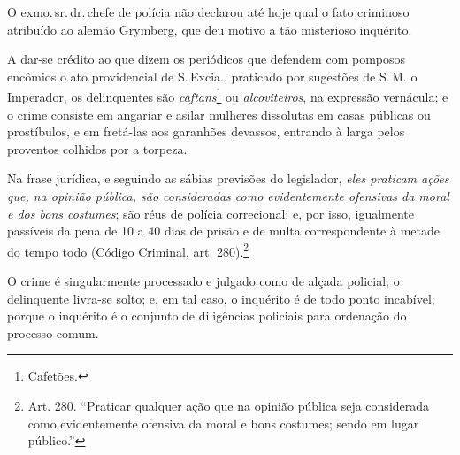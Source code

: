O exmo.\,sr.\,dr.\,chefe de polícia não declarou até hoje qual o fato
criminoso atribuído ao alemão Grymberg, que deu motivo a tão misterioso
inquérito.

A dar-se crédito ao que dizem os periódicos que defendem com pomposos
encômios o ato providencial de S.\,Excia., praticado por sugestões de S.\,M. o Imperador, os delinquentes são \emph{caftans}\footnote{Cafetões.} ou
\emph{alcoviteiros}, na expressão vernácula; e o crime consiste em
angariar e asilar mulheres dissolutas em casas públicas ou prostíbulos,
e em fretá-las aos garanhões devassos, entrando à larga pelos proventos
colhidos por a torpeza.

Na frase jurídica, e seguindo as sábias previsões do legislador,
\emph{eles praticam ações que, na opinião pública, são consideradas como
evidentemente ofensivas da moral e dos bons costumes}; são réus de
polícia correcional; e, por isso, igualmente passíveis da pena de 10 a
40 dias de prisão e de multa correspondente à metade do tempo todo
(Código Criminal, art. 280).\footnote{Art. 280. ``Praticar
  qualquer ação que na opinião pública seja considerada como
  evidentemente ofensiva da moral e bons costumes; sendo em lugar
  público.''}

O crime é singularmente processado e julgado como de alçada policial; o
delinquente livra-se solto; e, em tal caso, o inquérito é de todo ponto
incabível; porque o inquérito é o conjunto de diligências policiais para
ordenação do processo comum.

